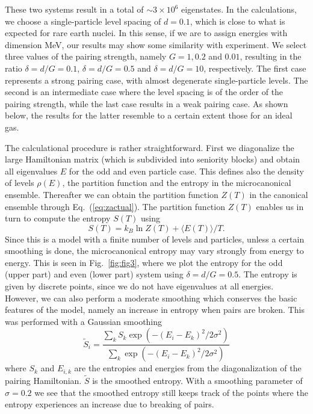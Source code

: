 These two systems result in a total of $\sim 3 \times 10^6$ eigenstates. In the calculations, we choose a single-particle level spacing of $d=0.1$, which is close to what is expected for rare earth nuclei. In this sense, if we are to assign energies with dimension MeV, our results may show some similarity with experiment. We select three values of the pairing strength, namely $G=1, 0.2$ and $0.01$, resulting in the ratio $\delta=d/G=0.1$, $\delta=d/G=0.5$ and $\delta=d/G=10$, respectively. The first case represents a strong pairing case, with almost degenerate single-particle levels. The second is an intermediate case where the level spacing is of the order of the pairing strength, while the last case results in a weak pairing case. As shown below, the results for the latter resemble to a certain extent those for an ideal gas.

The calculational procedure is rather straightforward. First we diagonalize the large Hamiltonian matrix (which is subdivided into seniority blocks) and obtain all eigenvalues $E$ for the odd and even particle case. This defines also the density of levels $\rho(E)$, the partition function and the entropy in the microcanonical ensemble. Thereafter we can obtain the partition function $Z(T)$ in the canonical ensemble through Eq.\ (\ref{eq:zactual}). The partition function $Z(T)$ enables us in turn to compute the entropy $S(T)$ using
\begin{equation}
    S(T)=k_B \ln Z(T)+\langle E(T)\rangle/T.
    \label{eq:canentropy}
\end{equation}
Since this is a model with a finite number of levels and particles, unless a certain smoothing is done, the microcanonical entropy may vary strongly from energy to energy. This is seen in Fig.\ \ref{fig:fig3}, where we plot the entropy for the odd (upper part) and even (lower part) system using $\delta = d/G= 0.5$. The entropy is given by discrete points, since we do not have eigenvalues at all energies. However, we can also perform a moderate smoothing which conserves the basic features of the model, namely an increase in entropy when pairs are broken. This was performed with a Gaussian smoothing
\begin{equation}
    \tilde{S}_i=\frac{\sum_kS_k\exp{(-(E_i-E_k)^2/2\sigma^2)}}
                {\sum_k\exp{(-(E_i-E_k)^2/2\sigma^2)}}
\end{equation}
where $S_k$ and $E_{i,k}$ are the entropies and energies from the diagonalization of the pairing Hamiltonian. $\tilde{S}$ is the smoothed entropy. With a smoothing parameter of $\sigma=0.2$ we see that the smoothed entropy still keeps track of the points where the entropy experiences an increase due to breaking of pairs.

